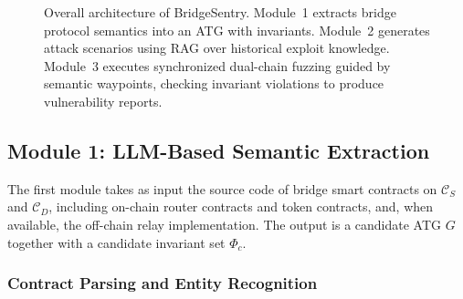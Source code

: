 \documentclass[journal]{IEEEtran}
\begin{document}
\begin{figure}[t]
\caption{Overall architecture of BridgeSentry. Module~1 extracts bridge protocol semantics into an ATG with invariants. Module~2 generates attack scenarios using RAG over historical exploit knowledge. Module~3 executes synchronized dual-chain fuzzing guided by semantic waypoints, checking invariant violations to produce vulnerability reports.}
\label{fig:architecture-old}
\end{figure}
\fi

\subsection{Module 1: LLM-Based Semantic Extraction}

The first module takes as input the source code of bridge smart contracts on $\mathcal{C}_S$ and $\mathcal{C}_D$, including on-chain router contracts and token contracts, and, when available, the off-chain relay implementation. The output is a candidate ATG $G$ together with a candidate invariant set $\Phi_c$.

\subsubsection{Contract Parsing and Entity Recognition}
\end{document}

